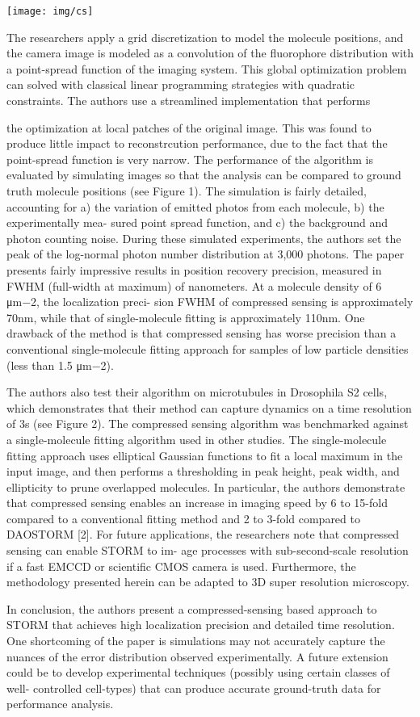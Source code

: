 \documentclass[8pt]{article}
\newlength{\norm}
\begin{document}
\texttt{[image: img/cs]}

The researchers apply a grid discretization to model the molecule positions, and the camera image is modeled as a convolution of the fluorophore distribution with a point-spread function of the imaging system. This global optimization problem can solved with classical linear programming strategies with quadratic constraints. The authors use a streamlined implementation that performs

the optimization at local patches of the original image. This was found to produce little impact to reconstrcution performance, due to the fact that the point-spread function is very narrow.
The performance of the algorithm is evaluated by simulating images so that the analysis can be compared to ground truth molecule positions (see Figure 1). The simulation is fairly detailed, accounting for a) the variation of emitted photos from each molecule, b) the experimentally mea- sured point spread function, and c) the background and photon counting noise. During these simulated experiments, the authors set the peak of the log-normal photon number distribution at 3,000 photons.
The paper presents fairly impressive results in position recovery precision, measured in FWHM (full-width at maximum) of nanometers. At a molecule density of 6 μm−2, the localization preci- sion FWHM of compressed sensing is approximately 70nm, while that of single-molecule fitting is approximately 110nm. One drawback of the method is that compressed sensing has worse precision than a conventional single-molecule fitting approach for samples of low particle densities (less than 1.5 μm−2).

The authors also test their algorithm on microtubules in Drosophila S2 cells, which demonstrates that their method can capture dynamics on a time resolution of 3s (see Figure 2). The compressed sensing algorithm was benchmarked against a single-molecule fitting algorithm used in other studies. The single-molecule fitting approach uses elliptical Gaussian functions to fit a local maximum in the input image, and then performs a thresholding in peak height, peak width, and ellipticity to prune overlapped molecules. In particular, the authors demonstrate that compressed sensing enables an increase in imaging speed by 6 to 15-fold compared to a conventional fitting method and 2 to 3-fold
compared to DAOSTORM [2].
For future applications, the researchers note that compressed sensing can enable STORM to im- age processes with sub-second-scale resolution if a fast EMCCD or scientific CMOS camera is used. Furthermore, the methodology presented herein can be adapted to 3D super resolution microscopy.

In conclusion, the authors present a compressed-sensing based approach to STORM that achieves high localization precision and detailed time resolution. One shortcoming of the paper is simulations may not accurately capture the nuances of the error distribution observed experimentally. A future extension could be to develop experimental techniques (possibly using certain classes of well- controlled cell-types) that can produce accurate ground-truth data for performance analysis.
\end{document}
